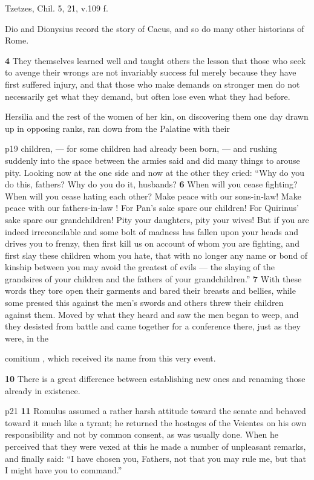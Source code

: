 Tzetzes, Chil. 5, 21, v.109 f.

Dio and Dionysius record the story of Cacus, and so do many other historians of Rome.

\textbf{4}
They themselves\texthebrew{⁠} learned well and taught others the lesson that those who seek to avenge their wrongs are not invariably success ­ful merely because they have first suffered injury, and that those who make demands on stronger men do not necessarily get what they demand, but often lose even what they had before.

Hersilia and the rest of the women of her kin, on discovering them one day drawn up in opposing ranks, ran down from the Palatine with their

p19 children, \texthebrew{—} for some children had already been born, \texthebrew{—} and rushing suddenly into the space between the armies said and did many things to arouse pity. Looking now at the one side and now at the other they cried: ``Why do you do this, fathers? Why do you do it, husbands? \textbf{6} When will you cease fighting? When will you cease hating each other? Make peace with our sons-in\texthebrew{‑}law! Make peace with our fathers-in\texthebrew{‑}law ! For Pan's sake spare our children! For Quirinus' sake spare our grandchildren! Pity your daughters, pity your wives! But if you are indeed irreconcilable and some bolt of madness has fallen upon your heads and drives you to frenzy, then first kill us on account of whom you are fighting, and first slay these children whom you hate, that with no longer any name or bond of kinship between you may avoid the greatest of evils \texthebrew{—} the slaying of the grandsires of your children and the fathers of your grandchildren.'' \textbf{7} With these words they tore open their garments and bared their breasts and bellies, while some pressed this against the men's swords and others threw their children against them. Moved by what they heard and saw the men began to weep, and they desisted from battle and came together for a conference there, just as they were, in the

comitium , which received its name from this very event.

\textbf{10}
There is a great difference between establishing new ones\texthebrew{⁠} and renaming those already in existence.

p21
\textbf{11}
Romulus assumed a rather harsh attitude toward the senate and behaved toward it much like a tyrant; he returned the hostages of the Veientes on his own responsibility and not by common consent, as was usually done. When he perceived that they were vexed at this he made a number of unpleasant remarks, and finally said: ``I have chosen you, Fathers, not that you may rule me, but that I might have you to command.''

